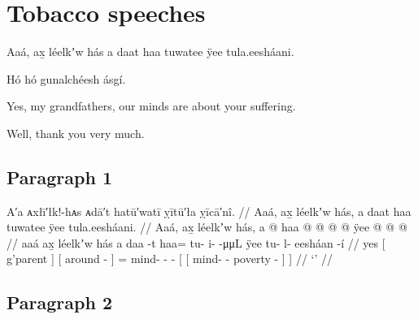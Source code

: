 
\resetexcnt
\chapter{Tobacco speeches}\label{ch:201-tobacco-speeches}

\vspace{1\baselineskip}

\begin{pairs}
\begin{Leftside}
\beginnumbering
\pstart\noindent
{}Aaá, ax̱ léelkʼw hás a daat haa tuwatee ÿee tula.eesháani.
\pend

\pstart
{}Hó hó gunalchéesh ásgí.
\pend
\endnumbering
\end{Leftside}
\begin{Rightside}
\beginnumbering
\pstart\noindent
{}Yes, my grandfathers, our minds are about your suffering.
\pend

\pstart
{}Well, thank you very much.
\pend
\endnumbering
\end{Rightside}
\end{pairs}
\Columns

\vspace{1\baselineskip}

\section{Paragraph 1}\label{sec:201-para-1}

\ex
\begingl
	\glpreamble	A′a ᴀxłī′łk!-hᴀs ᴀdā′t hatū′watī ỵītū′ła ỵīcā′nî. //
	\glpreamble	Aaá, ax̱ léelkʼw hás, a daat haa tuwatee ÿee tula.eesháani. //
	\gla	Aaá,
		{} ax̱ léelkʼw hás, {}
		{} a  @ {} {} 
		haa @  @ {} @ {} @ {}
		{} ÿee {}  @ {} @ {} @ {} {} {} //
	\glb	aaá
		{} ax̱ léelkʼw hás {}
		{} a daa -t {}
		haa= tu- i-  -μμL 
		{} ÿee {} tu- l- eesháan -í {} {} //
	\glc	yes 
		{}[  g’parent  {}]
		{}[  around - {}]
		= mind- -  -
		{}[  {}[ mind- - poverty - {}] {}] //
	\glft	‘’
		//
\endgl
\xe

\section{Paragraph 2}\label{sec:201-para-2}

